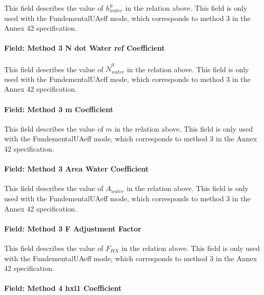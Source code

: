 This field describes the value of \(h_{water}^0\) in the relation above. This field is only used with the FundementalUAeff mode, which corresponds to method 3 in the Annex 42 specification.

\paragraph{Field: Method 3 N dot Water ref Coefficient}\label{field-method-3-n-dot-water-ref-coefficient}

This field describes the value of \(\dot N_{water}^0\) in the relation above. This field is only used with the FundementalUAeff mode, which corresponds to method 3 in the Annex 42 specification.

\paragraph{Field: Method 3 m Coefficient}\label{field-method-3-m-coefficient}

This field describes the value of \(m\) in the relation above. This field is only used with the FundementalUAeff mode, which corresponds to method 3 in the Annex 42 specification.

\paragraph{Field: Method 3 Area Water Coefficient}\label{field-method-3-area-water-coefficient}

This field describes the value of \({A_{water}}\) in the relation above. This field is only used with the FundementalUAeff mode, which corresponds to method 3 in the Annex 42 specification.

\paragraph{Field: Method 3 F Adjustment Factor}\label{field-method-3-f-adjustment-factor}

This field describes the value of \({F_{HX}}\) in the relation above. This field is only used with the FundementalUAeff mode, which corresponds to method 3 in the Annex 42 specification.

\paragraph{Field: Method 4 hxl1 Coefficient}\label{field-method-4-hxl1-coefficient}

